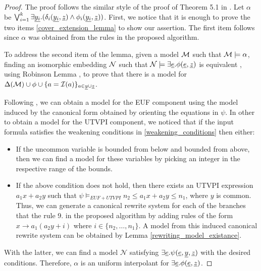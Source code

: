 \begin{proof}
  The proof follows the similar style of the proof of Theorem 
  5.1 in \cite{ghilardi2020compactly}.
  Let $\alpha$ be 
  $\bigvee_{i=1}^k \exists \underline{y_i} . (\delta_i(\underline{y_i}, \underline{z}) \land \phi_i(\underline{y_i}, \underline{z}))$.
  First, we notice that it is enough to prove the 
  two items \ref{cover_extension_lemma} to show 
  our assertion. The first item 
  follows since $\alpha$ was obtained from the rules 
  in the proposed algorithm.

  To address the second item of the lemma, given a
  model $\cal{M}$ such that $\cal{M} \models \alpha$, finding
  an isomorphic embedding $\cal{N}$ such that $\mathcal{N} \models
  \exists \underline{e} . \phi(\underline{e}, \underline{z})$ is equivalent
  , using Robinson Lemma \cite{chang2013model}, to prove that
  there is a model for $\Delta(\mathcal{M}) 
  \cup \phi 
  \cup \{ a = \mathcal{I}(a)\}_{a \in \underline{y} \cup \underline{z}}$.

  Following \cite{ghilardi2020compactly}, we can obtain 
  a model for the
  EUF component using the model induced by the canonical 
  form obtained by orienting the equations in $\psi$. 
  In other to obtain a model for the 
  UTVPI component, we noticed that if the 
  input formula satisfies the weakening 
  conditions in \ref{weakening_conditions}
  then either:
  \begin{itemize}
      \item If the uncommon variable is bounded 
        from below and 
        bounded from above, 
        then we can find a model for these variables
        by picking an integer
        in the respective range of the bounds.
      \item If the above condition does not
        hold, then there exists an UTVPI expression 
        $a_1 x + a_2 y$ such that
        $\psi \models_{EUF + UTVPI} n_2 \leq 
        a_1 x + a_2 y \leq n_1$, where $y$ is common.
        Thus, we can generate a canonical rewrite
        system for each of the branches that the
        rule 9. in the proposed algorithm by 
        adding rules of the form 
        $x \rightarrow a_1(a_2 y + i)$ where
        $i \in \{n_2, \dots, n_1\}$. A model 
        from this induced canonical rewrite system 
        can be obtained by Lemma 
        \ref{rewriting_model_existance}.
  \end{itemize}
  
  With the latter, we can find a model $\mathcal{N}$
  satisfying $\exists \underline{e} . 
  \psi(\underline{e}, \underline{y}, \underline{z})$
  with the desired conditions. 
  Therefore, $\alpha$ is an uniform interpolant
  for $\exists \underline{e}. \phi(\underline{e}, \underline{z})$.

\end{proof}



